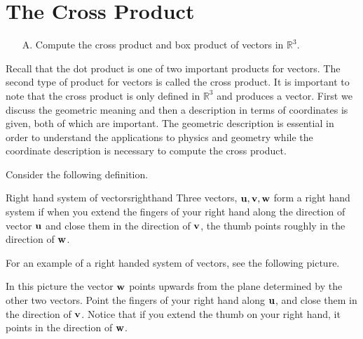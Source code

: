\section{The Cross Product}

\begin{outcome}

\begin{enumerate}

\item[A.] Compute the cross product and box product of vectors in $\mathbb{R}^3$.
\end{enumerate}
\end{outcome}

Recall that the dot product is one of two important products for vectors. The second type of product for vectors is called the cross product. It is important to note that the 
cross product is only defined in $\mathbb{R}^{3}$ and produces a vector. 
First we discuss the geometric meaning and then a description in terms of
coordinates is given, both of which are important. 
The geometric description is essential in order to understand the
applications to physics and geometry while the coordinate description is necessary to compute the cross product.

Consider the following definition.

\begin{definition}{Right hand system of vectors}{righthand}
Three vectors, ${\bf u},{\bf v},{\bf w}$ form a right hand system if when you
extend the fingers of your right hand along the direction of vector ${\bf u}$ and
close them in the direction of ${\bf v}$, the thumb points roughly in the
direction of ${\bf w}$.
\end{definition}

For an example of a right handed system of vectors, see the following
picture.

\begin{center}
\end{center}

In this picture the vector ${\bf w}$ points upwards from the plane
determined by the other two vectors. Point the fingers of your right hand along ${\bf u}$, and 
close them in the direction of ${\bf v}$. Notice that if you extend the thumb on your right hand,
it points in the direction of ${\bf w}$.

